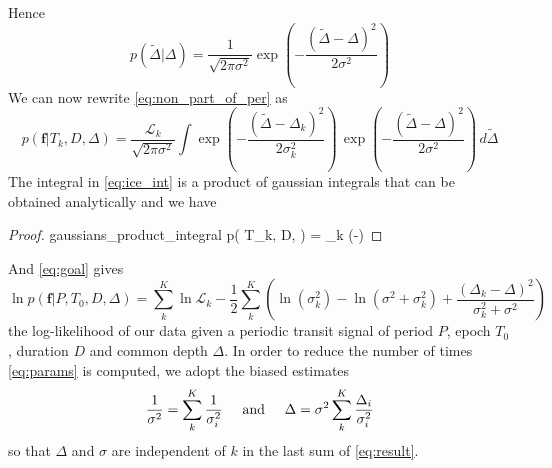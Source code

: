\documentclass{aastex631}
\begin{document}
Hence
$$p(\tilde\Delta | \Delta) = \frac{1}{\sqrt{2\pi\sigma^2}}\exp \left(-\frac{(\tilde\Delta-\Delta)^2}{2\sigma^2}\right)$$
We can now rewrite \autoref{eq:non_part_of_per} as
\begin{equation}\label{eq:ice_int}
    p(\bm{f} \vert T_k, D, \Delta) =  \frac{\mathcal{L}_k}{\sqrt{2\pi\sigma^2}} \int \exp\left(-\frac{(\tilde\Delta-\Delta_k)^2}{2\sigma_k^2}\right)\, \exp\left(-\frac{(\tilde\Delta-\Delta)^2}{2\sigma^2}\right)\, d\tilde\Delta
\end{equation}
The integral in \autoref{eq:ice_int} is a product of gaussian integrals that can be obtained analytically and we have
\begin{proof}{gaussians_product_integral}
    p( \vert T_k, D, \Delta) = _k   \exp\left(-\right)
\end{proof}
And \autoref{eq:goal} gives 
\begin{equation}\label{eq:result}
    \ln p(\bm{f} \vert P, T_0 ,D, \Delta) =  \sum_{k}^K \ln \mathcal{L}_k  - \frac{1}{2} \sum_k^K\left(\ln(\sigma_{k}^2) - \ln(\sigma^{2} + \sigma_{k}^{2}) +  \frac{\left(\Delta_{k} -
    \Delta\right)^{2}}{\sigma_k^{2} + \sigma^{2}}\right)
\end{equation}
the log-likelihood of our data given a periodic transit signal of period $P$, epoch $T_0$, duration $D$ and common depth $\Delta$. In order to reduce the number of times \autoref{eq:params} is computed, we adopt the biased estimates
$$\frac{1}{\sigma^2} = \sum_{k}^K \frac{1}{\sigma_i^2} \hspace{0.5cm}\text{and}\hspace{0.5cm} \Delta  = \sigma^2 \sum_{k}^K {\frac{\Delta_i}{\sigma_i^2}}$$
so that $\Delta$ and $\sigma$ are independent of $k$ in the last sum of \autoref{eq:result}.


\end{document}
